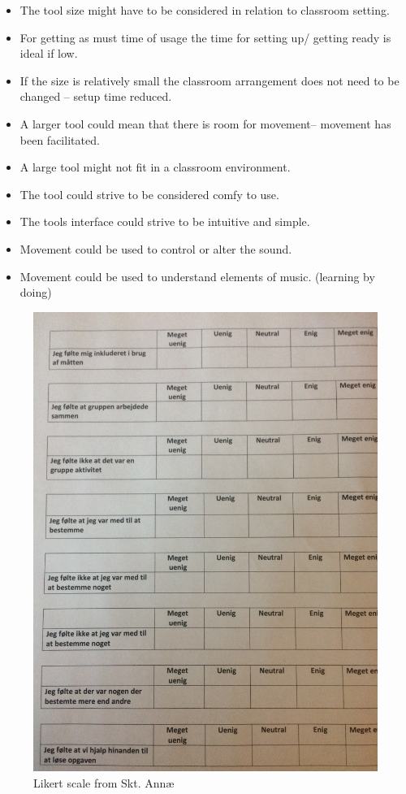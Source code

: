 \begin{itemize}
\item	The tool size might have to be considered in relation to classroom setting. 
\item	For getting as must time of usage the time for setting up/ getting ready is ideal if low. 
\item	If the size is relatively small the classroom arrangement does not need to be changed – setup time reduced. 
\item	A larger tool could mean that there is room for movement– movement has been facilitated. 
\item	A large tool might not fit in a classroom environment.
\item	The tool could strive to be considered comfy to use.   
\item	The tools interface could strive to be intuitive and simple.
\item	Movement could be used to control or alter the sound. 
\item	Movement could be used to understand elements of music. (learning by doing) 
\end{itemize}


\begin{figure}[H]
	\centering
	\includegraphics[width=0.7\linewidth]{figure/Appendices/likerts}
	\caption{Likert scale from Skt. Annæ}
	\label{fig:likertScale}
\end{figure}


